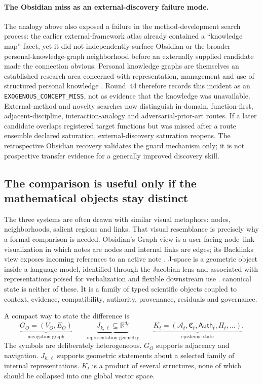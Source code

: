 \paragraph{The Obsidian miss as an external-discovery failure mode.}
The analogy above also exposed a failure in the method-development search process: the earlier external-framework atlas already contained a ``knowledge map'' facet, yet it did not independently surface Obsidian or the broader personal-knowledge-graph neighborhood before an externally supplied candidate made the connection obvious. Personal knowledge graphs are themselves an established research area concerned with representation, management and use of structured personal knowledge \cite{skjaeveland2023}. Round~44 therefore records this incident as an \texttt{EXOGENOUS\_CONCEPT\_MISS}, not as evidence that the knowledge was unavailable. External-method and novelty searches now distinguish in-domain, function-first, adjacent-discipline, interaction-analogy and adversarial-prior-art routes. If a later candidate overlaps registered target functions but was missed after a route ensemble declared saturation, external-discovery saturation reopens. The retrospective Obsidian recovery validates the guard mechanism only; it is not prospective transfer evidence for a generally improved discovery skill.

\subsection{The comparison is useful only if the mathematical objects stay distinct}

The three systems are often drawn with similar visual metaphors: nodes, neighborhoods, salient regions and links. That visual resemblance is precisely why a formal comparison is needed. Obsidian's Graph view is a user-facing node--link visualization in which notes are nodes and internal links are edges; its Backlinks view exposes incoming references to an active note \cite{obsidiangraph2026,obsidianbacklinks2026}. J-space is a geometric object inside a language model, identified through the Jacobian lens and associated with representations poised for verbalization and flexible downstream use \cite{gurnee2026}. \RAKL{} canonical state is neither of these. It is a family of typed scientific objects coupled to context, evidence, compatibility, authority, provenance, residuals and governance.

A compact way to state the difference is
\[
\underbrace{G_O=(V_O,E_O)}_{\text{navigation graph}}
\qquad
\underbrace{J_{k,\ell}\subseteq\mathbb R^{d_\ell}}_{\text{representation geometry}}
\qquad
\underbrace{K_t=(\mathcal A_t,\mathfrak C_t,\mathsf{Auth}_t,\Pi_t,\ldots)}_{\text{epistemic state}} .
\]
The symbols are deliberately heterogeneous. \(G_O\) supports adjacency and navigation. \(J_{k,\ell}\) supports geometric statements about a selected family of internal representations. \(K_t\) is a product of several structures, none of which should be collapsed into one global vector space.

